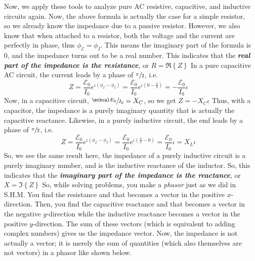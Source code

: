 \documentclass{scrartcl}
\begin{document}
    \quad Now, we apply these tools to analyze pure AC resistive, capacitive, and inductive circuits again. Now, the above formula is actually the case for a simple resistor, so we already know the impedance due to a passive resistor. However, we also know that when attached to a resistor, both the voltage and the current are perfectly in phase, thus $\phi_{\mathcal E}=\phi_I$. This means the imaginary part of the formula is 0, and the impedance turns out to be a real number. This indicates that the \textbf{\textit{real part of the impedance is the resistance}}, or $\boxed{R=\mathfrak R\left\{Z\right\}}$
    \newline\quad In a pure capacitive AC circuit, the current leads by a phase of $\sfrac\pi2$, i.e. \[Z=\frac{\mathcal E_0}{I_0}e^{\iota\left(\phi_{\mathcal E}-\phi_I\right)}=\frac{\mathcal E_0}{I_0}e^{\iota\left(0-\frac\pi2\right)}=-\frac{\mathcal E_0}{I_0}\iota\] Now, in a capacitive circuit, $\sfrac{\mthcal E_0}{I_0}=X_C$, so we get $\boxed{Z=-X_C\iota}$ Thus, with a capacitor, the impedance is a purely imaginary quantity that is actually the capacitive reactance.
    \newline\quad Likewise, in a purely inductive circuit, the emf leads by a phase of $\sfrac\pi2$, i.e. \[Z=\frac{\mathcal E_0}{I_0}e^{\iota\left(\phi_{\mathcal E}-\phi_I\right)}=\frac{\mathcal E_0}{I_0}e^{\iota\left(\frac\pi2-0\right)}=\frac{\mathcal E_0}{I_0}\iota=X_L\iota\] So, we see the same result here, the impedance of a purely inductive circuit is a purely imaginary number, and is the inductive reactance of the inductor. So, this indicates that the \textbf{\textit{imaginary part of the impedance is the reactance}}, or $\boxed{X=\mathfrak I\left\{Z\right\}}$
    \newline\quad So, while solving problems, you make a \textit{phasor} just as we did in S.H.M. You find the resistance and that becomes a vector in the positive $x$-direction. Then, you find the capacitive reactance and that becomes a vector in the negative $y$-direction while the inductive reactance becomes a vector in the positive $y$-direction. The sum of these vectors (which is equivalent to adding complex numbers) gives us the impedance vector. Now, the impedance is not actually a vector; it is merely the sum of quantities (which also themselves are not vectors) in a phasor like shown below.
\end{document}
